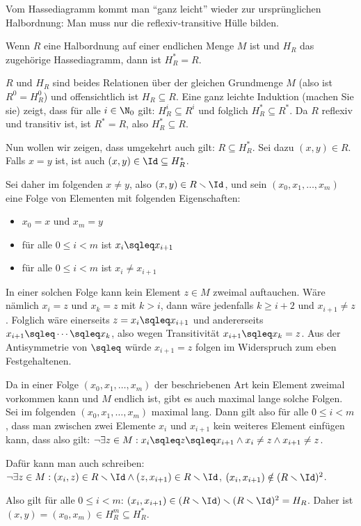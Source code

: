 Vom Hassediagramm kommt man "`ganz leicht"' wieder zur ursprünglichen
Halbordnung: Man  muss nur die reflexiv-transitive Hülle bilden.

\begin{lemma}
  \label{lem:h-stern=halbord}
  Wenn $R$ eine Halbordnung auf einer endlichen Menge $M$ ist und
  $H_R$ das zugehörige Hassediagramm, dann ist $H_R^*=R$.
\end{lemma}
%
\begin{beweis}
  \label{bew:h-stern=halbord}
  $R$ und $H_R$ sind beides Relationen über der gleichen Grundmenge
  $M$ (also ist $R^0=H_R^0$) und offensichtlich ist $H_R\subseteq
  R$. Eine ganz leichte Induktion (machen Sie sie) zeigt, dass für
  alle $i\in\N_0$ gilt: $H_R^i\subseteq R^i$ und folglich
  $H_R^*\subseteq R^*$. Da $R$ reflexiv und transitiv ist, ist
  $R^*=R$, also $H_R^*\subseteq R$.


  Nun wollen wir zeigen, dass umgekehrt auch gilt: $R\subseteq H_R^*$.
  Sei dazu $(x,y)\in R$. Falls $x=y$ ist, ist auch
  $(x,y)\in\Id\subseteq H_R^*$.

  Sei daher im folgenden $x\not= y$, also $(x,y)\in R\smallsetminus
  \Id$, und sein $(x_0, x_1, \dots, x_m)$ eine Folge von Elementen mit
  folgenden Eigenschaften:
  \begin{itemize}
  \item $x_0=x$ und $x_m=y$
  \item für alle $0\leq i<m$ ist $x_i\sqleq x_{i+1}$
  \item für alle $0\leq i<m$ ist $x_i\not= x_{i+1}$
  \end{itemize}
  In einer solchen Folge kann kein Element $z\in M$ zweimal
  auftauchen. Wäre nämlich $x_i=z$ und $x_k=z$ mit $k>i$, dann wäre
  jedenfalls $k\geq i+2$ und $x_{i+1}\not=z$. Folglich wäre einerseits
  $z=x_i\sqleq x_{i+1}$ und andererseits $x_{i+1}\sqleq \cdots \sqleq
  x_k$, also wegen Transitivität $x_{i+1}\sqleq x_k=z$. Aus der
  Antisymmetrie von $\sqleq$ würde $x_{i+1}=z$ folgen im
  Widerspruch zum eben Festgehaltenen.

  Da in einer Folge $(x_0, x_1, \dots, x_m)$ der beschriebenen Art
  kein Element zweimal vorkommen kann und $M$ endlich ist, gibt es
  auch maximal lange solche Folgen. Sei im folgenden $(x_0, x_1,
  \dots, x_m)$ maximal lang. Dann gilt also für alle $0\leq i<m$, dass
  man zwischen zwei Elemente $x_i$ und $x_{i+1}$ kein weiteres Element
  einfügen kann, dass also gilt: $\lnot \exists z\in M: x_i \sqleq z
  \sqleq x_{i+1} \land x_i\not=z \land x_{i+1}\not=z$.

  Dafür kann man auch schreiben: $\lnot \exists z\in M: (x_i,z)\in
  R\smallsetminus \Id \land (z,x_{i+1})\in R\smallsetminus \Id$, \dh
  $(x_i,x_{i+1})\notin(R\smallsetminus \Id)^2$.

  Also gilt für alle $0\leq i<m$: $(x_i,x_{i+1})\in (R\smallsetminus
  \Id)\smallsetminus (R\smallsetminus \Id)^2=H_R$. Daher ist
  $(x,y)=(x_0,x_m)\in H_R^m\subseteq H_R^*$.
\end{beweis}

